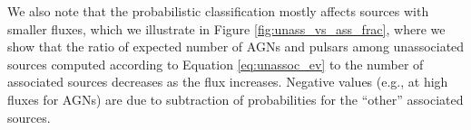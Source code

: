 We also note that the probabilistic classification mostly affects sources with smaller fluxes,
which we illustrate in Figure \ref{fig:unass_vs_ass_frac}, where we show that the ratio of expected number of AGNs and pulsars among unassociated sources computed according to Equation \ref{eq:unassoc_ev} to the number of associated sources decreases as the flux increases.
Negative values (e.g., at high fluxes for AGNs) are due to subtraction of probabilities for the ``other'' associated sources.






